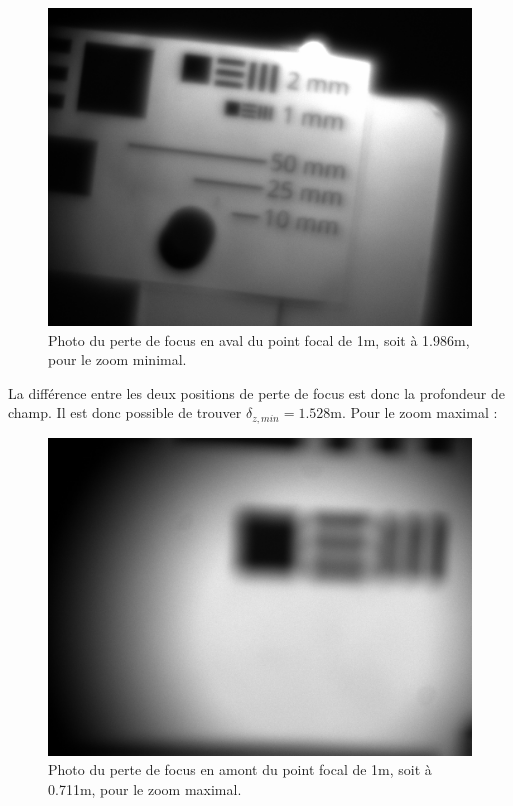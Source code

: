 \documentclass[11pt,letterpaper]{article}
\begin{document}
\begin{figure}[H]
  \centering
  \includegraphics[scale=0.3]{prof_1.986_min.png}
  \caption{Photo du perte de focus en aval du point focal de 1m, soit à 1.986m,
  pour le zoom minimal.}
  \label{prof_arr_min}
\end{figure}

La différence entre les deux positions de perte de focus est donc la profondeur de
champ. Il est donc possible de trouver $\delta_{z,min}= 1.528$m. Pour le zoom maximal :

\begin{figure}[H]
  \centering
  \includegraphics[scale=0.3]{prof_0.711m_max.png}
  \caption{Photo du perte de focus en amont du point focal de 1m, soit à 0.711m,
  pour le zoom maximal.}
  \label{prof_avant_max}
\end{figure}
\end{document}
